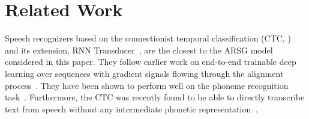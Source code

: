 \documentclass{article} %
\begin{document}
%
%

\section{Related Work}

Speech recognizers based on the connectionist temporal classification (CTC,
\cite{graves_2006_connectionist}) and its extension, RNN
Transducer~\cite{graves_2012_sequence}, are the closest to the ARSG model
considered in this paper. They follow earlier work on end-to-end trainable deep
learning over sequences with gradient signals flowing through the alignment
process~\cite{LeCun98-small}. They have been shown to perform well on the
phoneme recognition task~\cite{graves_2013_timit}.  Furthermore, the CTC was
recently found to be able to directly transcribe text from speech without any
intermediate phonetic representation~\cite{graves_2014_towards}.
\end{document}
